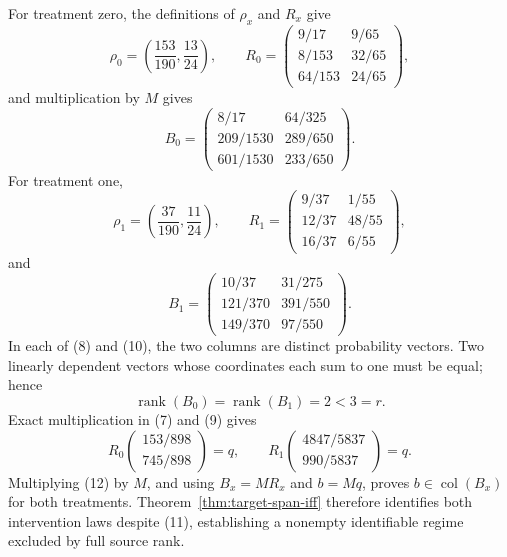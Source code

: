For treatment zero, the definitions of \(\rho_x\) and \(R_x\) give
\[
\rho_0=\left(\frac{153}{190},\frac{13}{24}\right),\qquad
R_0=
\begin{pmatrix}
9/17&9/65\\
8/153&32/65\\
64/153&24/65
\end{pmatrix},
\tag{7}
\]
and multiplication by \(M\) gives
\[
B_0=
\begin{pmatrix}
8/17&64/325\\
209/1530&289/650\\
601/1530&233/650
\end{pmatrix}.
\tag{8}
\]
For treatment one,
\[
\rho_1=\left(\frac{37}{190},\frac{11}{24}\right),\qquad
R_1=
\begin{pmatrix}
9/37&1/55\\
12/37&48/55\\
16/37&6/55
\end{pmatrix},
\tag{9}
\]
and
\[
B_1=
\begin{pmatrix}
10/37&31/275\\
121/370&391/550\\
149/370&97/550
\end{pmatrix}.
\tag{10}
\]
In each of (8) and (10), the two columns are distinct probability vectors.  Two linearly dependent vectors whose coordinates each sum to one must be equal; hence
\[
\operatorname{rank}(B_0)=\operatorname{rank}(B_1)=2<3=r.
\tag{11}
\]
Exact multiplication in (7) and (9) gives
\[
R_0
\begin{pmatrix}153/898\\745/898\end{pmatrix}=q,
\qquad
R_1
\begin{pmatrix}4847/5837\\990/5837\end{pmatrix}=q.
\tag{12}
\]
Multiplying (12) by \(M\), and using \(B_x=MR_x\) and \(b=Mq\), proves \(b\in\operatorname{col}(B_x)\) for both treatments.  Theorem~\ref{thm:target-span-iff} therefore identifies both intervention laws despite (11), establishing a nonempty identifiable regime excluded by full source rank.